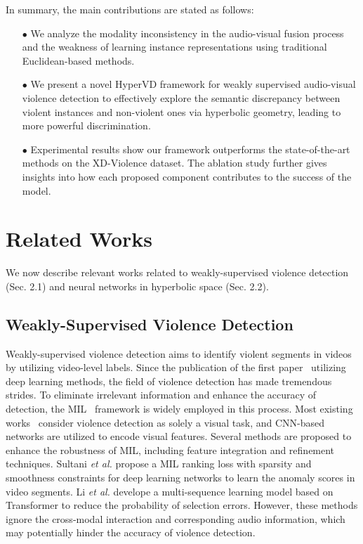 \documentclass[sigconf]{acmart}
\newcommand{\etal}{{\emph{et al. }}}
\begin{document}
In summary, the main contributions are stated as follows:
\begin{itemize}[leftmargin=*]
\item[$\bullet$]We analyze the modality inconsistency in the audio-visual fusion process and the weakness of learning instance representations using traditional Euclidean-based methods.
\item[$\bullet$]We present a novel HyperVD framework for weakly supervised audio-visual violence detection to effectively explore the semantic discrepancy between violent instances and non-violent ones via hyperbolic geometry, leading to more powerful discrimination.
\item[$\bullet$]Experimental results show our framework outperforms the state-of-the-art methods on the XD-Violence dataset. The ablation study further gives insights into how each proposed component contributes to the success of the model.
\end{itemize}



\section{Related Works}
We now describe relevant works related to weakly-supervised violence detection (Sec. 2.1) and neural networks in hyperbolic space (Sec. 2.2).
\subsection{Weakly-Supervised Violence Detection}
Weakly-supervised violence detection aims to identify violent segments in videos by utilizing video-level labels. Since the publication of the first paper~\cite{Ding2014ViolenceDI} utilizing deep learning methods, the field of violence detection has made tremendous strides. To eliminate irrelevant information and enhance the accuracy of detection, the MIL~\cite{maron1997framework} framework is widely employed in this process. Most existing works~\cite{RendnSegador2023CrimeNetNS, bermejo2011violence, deniz2014fast, feng2021mist, peixoto2019toward, ristea2021self, c:8, zhang2019temporal, zhang2016new} consider violence detection as solely a visual task, and CNN-based networks are utilized to encode visual features. Several methods are proposed to enhance the robustness of MIL, including feature integration and refinement techniques. Sultani \etal \cite{c:7} propose a MIL ranking loss with sparsity and smoothness constraints for deep learning networks to learn the anomaly scores in video segments. Li \etal \cite{c:9} develope a multi-sequence learning model based on Transformer \cite{Vaswani2017AttentionIA} to reduce the probability of selection errors.  
However, these methods ignore the cross-modal interaction and corresponding audio information, which may potentially hinder the accuracy of violence detection.
\end{document}
